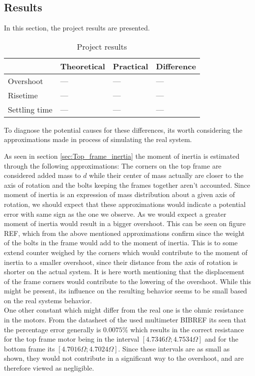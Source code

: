 \documentclass[../../main]{subfiles}
\begin{document}
\subsection{Results}
\label{sec:results}
In this section, the project results are presented.

\begin{table}[H]
\centering
\begin{tabular}{|l|l|l|l|}
\hline
                & Theoretical & Practical & Difference \\
\hline
Overshoot               & ---   & ---  & --- \\
\hline
Risetime                & ---   & ---  & --- \\
\hline
Settling time           & ---   & ---  & --- \\
\hline
\end{tabular}
\caption{Project results}
    \label{tab:project_results}
\end{table}


To diagnose the potential causes for these differences, its worth considering the approximations made in process of simulating the real system.


As seen in section \ref{sec:Top_frame_inertia} the moment of inertia is estimated through the following approximations: The corners on the top frame are considered added mass to $d$ while their center of mass actually are closer to the axis of rotation and the bolts keeping the frames together aren't accounted. Since moment of inertia is an expression of mass distribution about a given axis of rotation, we should expect that these approximations would indicate a potential error with same sign as the one we observe. As we would expect a greater moment of inertia would result in a bigger overshoot. This can be seen on figure REF, which from the above mentioned approximations confirm since the weight of the bolts in the frame would add to the moment of inertia. This is to some extend counter weighed by the corners which would contribute to the moment of inertia to a smaller overshoot, since their distance from the axis of rotation is shorter on the actual system. It is here worth mentioning that the displacement of the frame corners would contribute to the lowering of the overshoot. While this might be present, its influence on the resulting behavior seems to be small based on the real systems behavior.\\
One other constant which might differ from the real one is the ohmic resistance in the motors. From the datasheet of the used multimeter BIBREF its seen that the percentage error generally is $0.0075\%$ which results in the correct resistance for the top frame motor being in the interval $[4.7346\Omega;4.7534\Omega]$ and for the bottom frame its $[4.7016\Omega;4.7024\Omega]$. Since these intervals are as small as shown, they would not contribute in a significant way to the overshoot, and are therefore viewed as negligible.\\
\end{document}
